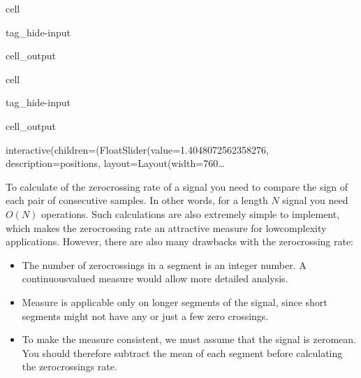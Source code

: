 \documentclass[letterpaper,10pt,english]{jupyterBook}
\begin{document}
\begin{sphinxuseclass}{cell}
\begin{sphinxuseclass}{tag_hide-input}\begin{sphinxVerbatimOutput}

\begin{sphinxuseclass}{cell_output}
\noindent{}

\end{sphinxuseclass}\end{sphinxVerbatimOutput}

\end{sphinxuseclass}
\end{sphinxuseclass}
\begin{sphinxuseclass}{cell}
\begin{sphinxuseclass}{tag_hide-input}\begin{sphinxVerbatimOutput}

\begin{sphinxuseclass}{cell_output}
\begin{sphinxVerbatim}[commandchars=\\\{\}]
interactive(children=(FloatSlider(value=1.4048072562358276, description=\PYGZsq{}position\PYGZus{}s\PYGZsq{}, layout=Layout(width=\PYGZsq{}760…
\end{sphinxVerbatim}

\end{sphinxuseclass}\end{sphinxVerbatimOutput}

\end{sphinxuseclass}
\end{sphinxuseclass}
\sphinxAtStartPar
To calculate of the zero\sphinxhyphen{}crossing rate of a signal you need to compare
the sign of each pair of consecutive samples. In other words, for a
length \(N\) signal you need \(O(N)\) operations. Such calculations are also
extremely simple to implement, which makes the zero\sphinxhyphen{}crossing rate an
attractive measure for low\sphinxhyphen{}complexity applications. However, there are
also many drawbacks with the zero\sphinxhyphen{}crossing rate:
\begin{itemize}
\item {} 
\sphinxAtStartPar
The number of zero\sphinxhyphen{}crossings in a segment is an integer number. A
continuous\sphinxhyphen{}valued measure would allow more detailed analysis.

\item {} 
\sphinxAtStartPar
Measure is applicable only on longer segments of the signal, since
short segments might not have any or just a few zero crossings.

\item {} 
\sphinxAtStartPar
To make the measure consistent, we must assume that the signal is
zero\sphinxhyphen{}mean. You should therefore subtract the mean of each segment
before calculating the zero\sphinxhyphen{}crossings rate.

\end{itemize}
\end{document}
